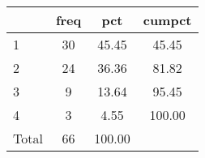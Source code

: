 {
\def\sym#1{\ifmmode^{#1}\else\(^{#1}\)\fi}
\begin{tabular}{l*{1}{ccc}}
\hline\hline
            &        freq&         pct&      cumpct\\
\hline
1           &          30&       45.45&       45.45\\
2           &          24&       36.36&       81.82\\
3           &           9&       13.64&       95.45\\
4           &           3&        4.55&      100.00\\
Total       &          66&      100.00&            \\
\hline\hline
\end{tabular}
}
